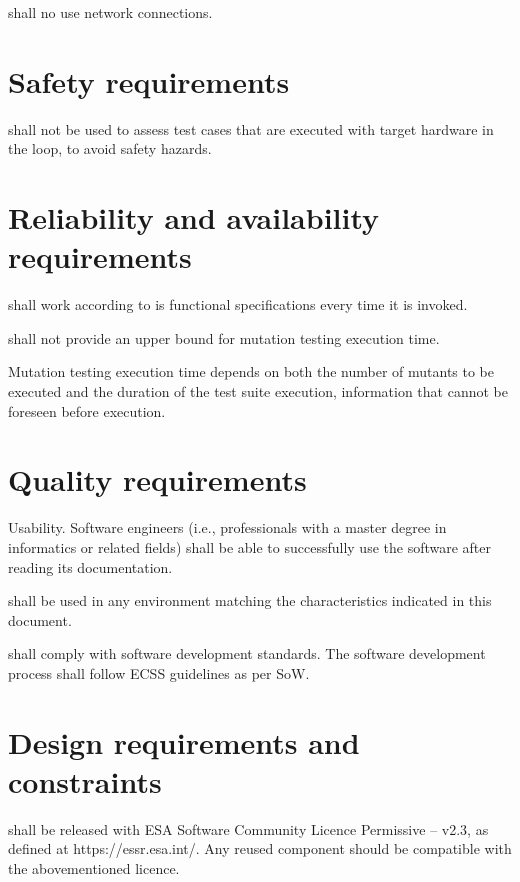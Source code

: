 \RQ{} \FAQAS shall no use network connections.

\section{Safety requirements}

\RQ{} \FAQAS shall not be used to assess test cases that are executed with target hardware in the loop, to avoid safety hazards.

\section{Reliability and availability requirements}

\RQ{} \FAQAS shall work according to is functional specifications every time it is invoked.


\RQ{} \FAQAS shall not provide an upper bound for mutation testing execution time.

\remark Mutation testing execution time depends on both the number of mutants to be executed and the duration of the test suite execution, information that cannot be foreseen before execution.

\section{Quality requirements}

\RQ{} Usability. Software engineers (i.e., professionals with a master degree in informatics or related fields) shall be able to successfully use the software after reading its documentation.

\RQ{} \FAQAS shall be used in any environment matching the characteristics indicated in this document.

\RQ{} \FAQAS shall comply with software development standards. The software development process shall follow ECSS guidelines as per SoW.


\section{Design requirements and constraints}

\RQ{} \FAQAS shall be released with ESA Software Community Licence Permissive – v2.3, as defined at https://essr.esa.int/. Any reused component should be compatible with the abovementioned licence.

